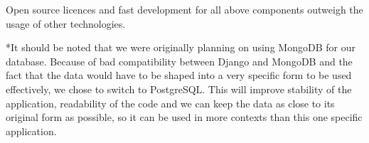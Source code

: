 Open source licences and fast development for all above components outweigh the usage of other technologies.

*It should be noted that we were originally planning on using MongoDB for our database. Because of bad compatibility between Django and MongoDB and the fact that the data would have to be shaped into a very specific form to be used effectively, we chose to switch to PostgreSQL.
This will improve stability of the application, readability of the code and we can keep the data as close to its original form as possible, so it can be used in more contexts than this one specific application.

